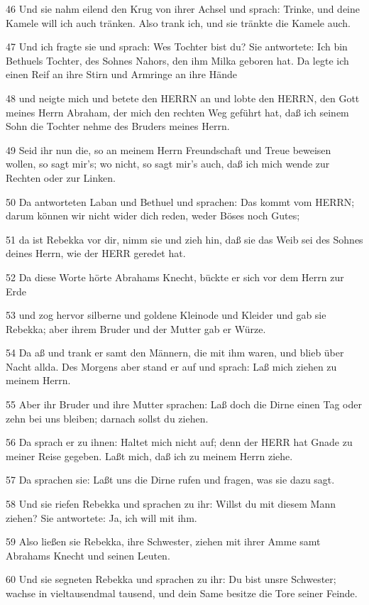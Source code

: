\par 46 Und sie nahm eilend den Krug von ihrer Achsel und sprach: Trinke, und deine Kamele will ich auch tränken. Also trank ich, und sie tränkte die Kamele auch.
\par 47 Und ich fragte sie und sprach: Wes Tochter bist du? Sie antwortete: Ich bin Bethuels Tochter, des Sohnes Nahors, den ihm Milka geboren hat. Da legte ich einen Reif an ihre Stirn und Armringe an ihre Hände
\par 48 und neigte mich und betete den HERRN an und lobte den HERRN, den Gott meines Herrn Abraham, der mich den rechten Weg geführt hat, daß ich seinem Sohn die Tochter nehme des Bruders meines Herrn.
\par 49 Seid ihr nun die, so an meinem Herrn Freundschaft und Treue beweisen wollen, so sagt mir's; wo nicht, so sagt mir's auch, daß ich mich wende zur Rechten oder zur Linken.
\par 50 Da antworteten Laban und Bethuel und sprachen: Das kommt vom HERRN; darum können wir nicht wider dich reden, weder Böses noch Gutes;
\par 51 da ist Rebekka vor dir, nimm sie und zieh hin, daß sie das Weib sei des Sohnes deines Herrn, wie der HERR geredet hat.
\par 52 Da diese Worte hörte Abrahams Knecht, bückte er sich vor dem Herrn zur Erde
\par 53 und zog hervor silberne und goldene Kleinode und Kleider und gab sie Rebekka; aber ihrem Bruder und der Mutter gab er Würze.
\par 54 Da aß und trank er samt den Männern, die mit ihm waren, und blieb über Nacht allda. Des Morgens aber stand er auf und sprach: Laß mich ziehen zu meinem Herrn.
\par 55 Aber ihr Bruder und ihre Mutter sprachen: Laß doch die Dirne einen Tag oder zehn bei uns bleiben; darnach sollst du ziehen.
\par 56 Da sprach er zu ihnen: Haltet mich nicht auf; denn der HERR hat Gnade zu meiner Reise gegeben. Laßt mich, daß ich zu meinem Herrn ziehe.
\par 57 Da sprachen sie: Laßt uns die Dirne rufen und fragen, was sie dazu sagt.
\par 58 Und sie riefen Rebekka und sprachen zu ihr: Willst du mit diesem Mann ziehen? Sie antwortete: Ja, ich will mit ihm.
\par 59 Also ließen sie Rebekka, ihre Schwester, ziehen mit ihrer Amme samt Abrahams Knecht und seinen Leuten.
\par 60 Und sie segneten Rebekka und sprachen zu ihr: Du bist unsre Schwester; wachse in vieltausendmal tausend, und dein Same besitze die Tore seiner Feinde.
